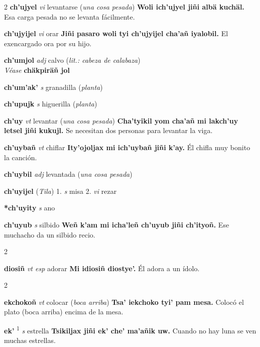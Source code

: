 \documentclass[10pt]{scrbook}
\newcommand{\entry}[1]{\textbf{#1}}
\newcommand{\alphaletter}[1]{\end{multicols}\addsec{#1}\begin{multicols}{2}}
\newcommand{\onedefinition}[1]{#1.}
\newcommand{\defsuperscript}[1]{\textsuperscript{#1}}
\newcommand{\partofspeech}[1]{\textit{#1}}
\newcommand{\spanishtranslation}[1]{#1}
\newcommand{\clarification}[1]{(\textit{#1})}
\newcommand{\cholexample}[1]{\textbf{#1}}
\newcommand{\exampletranslation}[1]{#1}
\newcommand{\alsosee}[1]{\\\textit{Véase} \textbf{#1}}
\newcommand{\relevantdialect}[1]{(\textit{#1})}
\begin{document}
\begin{multicols}{2}
\entry{ch'ujyel}
\partofspeech{vi}
\spanishtranslation{levantarse}
\clarification{una cosa pesada}
\cholexample{Woli ich'ujyel jiñi albä kuchäl.}
\exampletranslation{Esa carga pesada no se levanta fácilmente.}

\entry{ch'ujyijel}
\partofspeech{vi}
\spanishtranslation{orar}
\cholexample{Jiñi pasaro woli tyi ch'ujyijel cha'añ iyalobil.}
\exampletranslation{El exencargado ora por su hijo.}

\entry{ch'umjol}
\partofspeech{adj}
\spanishtranslation{calvo}
\clarification{lit.: cabeza de calabaza}
\alsosee{chäkpiräñ jol}

\entry{ch'um'ak'}
\partofspeech{s}
\spanishtranslation{granadilla}
\clarification{planta}

\entry{ch'upujk}
\partofspeech{s}
\spanishtranslation{higuerilla}
\clarification{planta}

\entry{ch'uy}
\partofspeech{vt}
\spanishtranslation{levantar}
\clarification{una cosa pesada}
\cholexample{Cha'tyikil yom cha'añ mi lakch'uy letsel jiñi kukujl.}
\exampletranslation{Se necesitan dos personas para levantar la viga.}

\entry{ch'uybañ}
\partofspeech{vt}
\spanishtranslation{chiflar}
\cholexample{Ity'ojoljax mi ich'uybañ jiñi k'ay.}
\exampletranslation{Él chifla muy bonito la canción.}

\entry{ch'uybil}
\partofspeech{adj}
\spanishtranslation{levantada}
\clarification{una cosa pesada}

\entry{ch'uyijel}
\relevantdialect{Tila}
\onedefinition{1}
\partofspeech{s}
\spanishtranslation{misa}
\onedefinition{2}
\partofspeech{vi}
\spanishtranslation{rezar}

\entry{*ch'uyity}
\partofspeech{s}
\spanishtranslation{ano}

\entry{ch'uyub}
\partofspeech{s}
\spanishtranslation{silbido}
\cholexample{Weñ k'am mi icha'leñ ch'uyub jiñi ch'ityoñ.}
\exampletranslation{Ese muchacho da un silbido recio.}

\alphaletter{D}

\entry{diosiñ}
\partofspeech{vt esp}
\spanishtranslation{adorar}
\cholexample{Mi idiosiñ diostye'.}
\exampletranslation{Él adora a un ídolo.}

\alphaletter{E}

\entry{ekchokoñ}
\partofspeech{vt}
\spanishtranslation{colocar}
\clarification{boca arriba}
\cholexample{Tsa' iekchoko tyi' pam mesa.}
\exampletranslation{Colocó el plato (boca arriba) encima de la mesa.}

\entry{ek'}
\defsuperscript{1}
\partofspeech{s}
\spanishtranslation{estrella}
\cholexample{Tsikiljax jiñi ek' che' ma'añik uw.}
\exampletranslation{Cuando no hay luna se ven muchas estrellas.}


\end{multicols}
\end{document}
